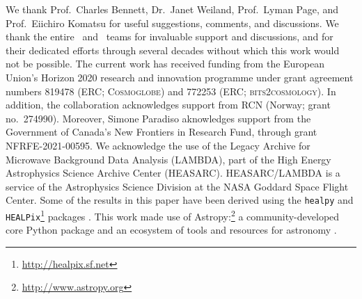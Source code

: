 \begin{acknowledgements}
  We thank Prof.~Charles Bennett, Dr.~Janet Weiland, Prof.~Lyman Page, and
  Prof.~Eiichiro Komatsu for useful suggestions, comments, and discussions.
  We thank the entire \Planck\ and \WMAP\ teams for
  invaluable support and discussions, and for their dedicated efforts
  through several decades without which this work would not be
  possible. The current work has received funding from the European
  Union’s Horizon 2020 research and innovation programme under grant
  agreement numbers 819478 (ERC; \textsc{Cosmoglobe}) and 772253 (ERC;
  \textsc{bits2cosmology}).
  In
  addition, the collaboration acknowledges support from
  RCN (Norway; grant no.\ 274990). Moreover, Simone Paradiso aknowledges
  support from the Government of Canada's New Frontiers in Research Fund,
  through grant NFRFE-2021-00595.
  We acknowledge the use of the Legacy Archive for Microwave Background Data
  Analysis (LAMBDA), part of the High Energy Astrophysics Science Archive Center
  (HEASARC). HEASARC/LAMBDA is a service of the Astrophysics Science Division at
  the NASA Goddard Space Flight Center.  
  Some of the results in this paper have been derived using the \texttt{healpy}
  and \texttt{HEALPix}\footnote{\url{http://healpix.sf.net}} packages
  \citep{gorski2005, Zonca2019}.  This work made use of
  Astropy:\footnote{\url{http://www.astropy.org}} a community-developed
  core Python package and an ecosystem of tools and resources for
  astronomy \citep{astropy:2013, astropy:2018, astropy:2022}.
\end{acknowledgements}
